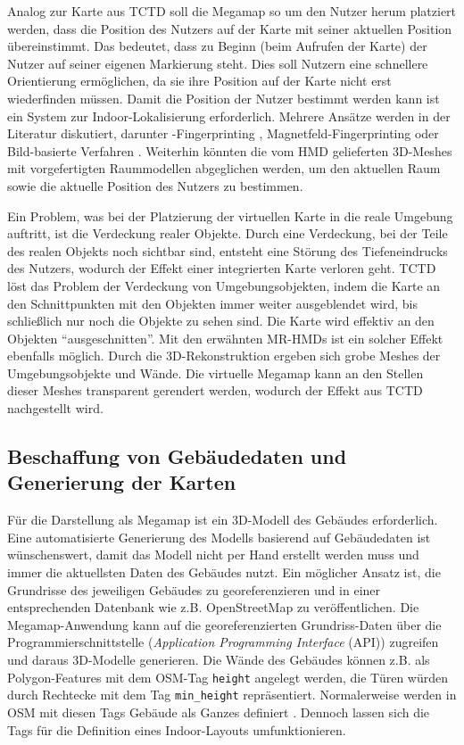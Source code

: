Analog zur Karte aus TCTD soll die Megamap so um den Nutzer herum platziert werden, dass die Position des Nutzers auf der Karte mit seiner aktuellen Position übereinstimmt.
Das bedeutet, dass zu Beginn (beim Aufrufen der Karte) der Nutzer auf seiner eigenen Markierung steht.
Dies soll Nutzern eine schnellere Orientierung ermöglichen, da sie ihre Position auf der Karte nicht erst wiederfinden müssen.
Damit die Position der Nutzer bestimmt werden kann ist ein System zur Indoor-Lokalisierung erforderlich.
Mehrere Ansätze werden in der Literatur diskutiert, darunter \wifi-Fingerprinting \parencites{Lautenschlaeger2012}{Alnabhan2014}, Magnetfeld-Fingerprinting \parencites{Hashish2017}{Ang2018} oder Bild-basierte Verfahren \parencites{Kalkusch2002}{Moeller2014}{Silva2015}.
Weiterhin könnten die vom HMD gelieferten 3D-Meshes mit vorgefertigten Raummodellen abgeglichen werden, um den aktuellen Raum sowie die aktuelle Position des Nutzers zu bestimmen.

Ein Problem, was bei der Platzierung der virtuellen Karte in die reale Umgebung auftritt, ist die Verdeckung realer Objekte.
Durch eine Verdeckung, bei der Teile des realen Objekts noch sichtbar sind, entsteht eine Störung des Tiefeneindrucks des Nutzers, wodurch der Effekt einer integrierten Karte verloren geht.
TCTD löst das Problem der Verdeckung von Umgebungsobjekten, indem die Karte an den Schnittpunkten mit den Objekten immer weiter ausgeblendet wird, bis schließlich nur noch die Objekte zu sehen sind.
Die Karte wird effektiv an den Objekten \enquote{ausgeschnitten}.
Mit den erwähnten MR-HMDs ist ein solcher Effekt ebenfalls möglich.
Durch die 3D-Rekonstruktion ergeben sich grobe Meshes der Umgebungsobjekte und Wände.
Die virtuelle Megamap kann an den Stellen dieser Meshes transparent gerendert werden, wodurch der Effekt aus TCTD nachgestellt wird.

\subsection{Beschaffung von Gebäudedaten und Generierung der Karten}
Für die Darstellung als Megamap ist ein 3D-Modell des Gebäudes erforderlich.
Eine automatisierte Generierung des Modells basierend auf Gebäudedaten ist wünschenswert, damit das Modell nicht per Hand erstellt werden muss und immer die aktuellsten Daten des Gebäudes nutzt.
Ein möglicher Ansatz ist, die Grundrisse des jeweiligen Gebäudes zu georeferenzieren und in einer entsprechenden Datenbank wie z.B. OpenStreetMap zu veröffentlichen.
Die Megamap-Anwendung kann auf die georeferenzierten Grundriss-Daten über die Programmierschnittstelle (\emph{Application Programming Interface} (API)) zugreifen und daraus 3D-Modelle generieren.
Die Wände des Gebäudes können z.B. als Polygon-Features mit dem OSM-Tag \lstinline{height} angelegt werden, die Türen würden durch Rechtecke mit dem Tag \lstinline{min_height} repräsentiert.
Normalerweise werden in OSM mit diesen Tags Gebäude als Ganzes definiert \parencite{OpenStreetMapFoundation2018b}.
Dennoch lassen sich die Tags für die Definition eines Indoor-Layouts umfunktionieren.

